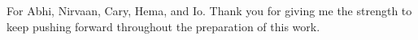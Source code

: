\documentclass[letterpaper,12pt]{report}	%
\begin{document}

\copyrightpage  %

\commcertpage   %

\titlepage      %


\begin{dedication}		%
For Abhi, Nirvaan, Cary, Hema, and Io. Thank you for giving me the strength to keep pushing forward throughout the preparation of this work.  
\end{dedication}




%
\utabstract
\end{document}

